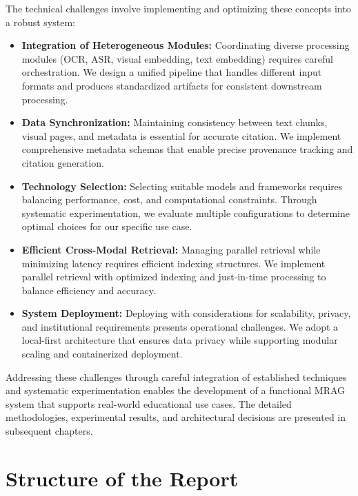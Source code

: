 The technical challenges involve implementing and optimizing these concepts into a robust system:

\begin{itemize}
    \item \textbf{Integration of Heterogeneous Modules:} Coordinating diverse processing modules (OCR, ASR, visual embedding, text embedding) requires careful orchestration. We design a unified pipeline that handles different input formats and produces standardized artifacts for consistent downstream processing.
    
    \item \textbf{Data Synchronization:} Maintaining consistency between text chunks, visual pages, and metadata is essential for accurate citation. We implement comprehensive metadata schemas that enable precise provenance tracking and citation generation.
    
    \item \textbf{Technology Selection:} Selecting suitable models and frameworks requires balancing performance, cost, and computational constraints. Through systematic experimentation, we evaluate multiple configurations to determine optimal choices for our specific use case.
    
    \item \textbf{Efficient Cross-Modal Retrieval:} Managing parallel retrieval while minimizing latency requires efficient indexing structures. We implement parallel retrieval with optimized indexing and just-in-time processing to balance efficiency and accuracy.
    
    \item \textbf{System Deployment:} Deploying with considerations for scalability, privacy, and institutional requirements presents operational challenges. We adopt a local-first architecture that ensures data privacy while supporting modular scaling and containerized deployment.
\end{itemize}

Addressing these challenges through careful integration of established techniques and systematic experimentation enables the development of a functional MRAG system that supports real-world educational use cases. The detailed methodologies, experimental results, and architectural decisions are presented in subsequent chapters.

\section{Structure of the Report}

